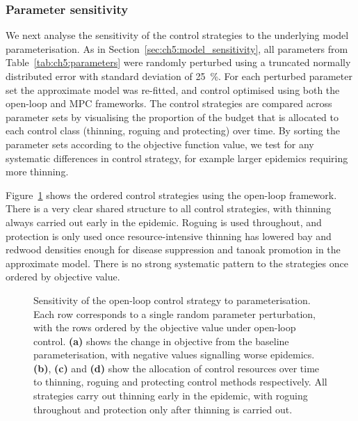 \subsubsection{Parameter sensitivity}

We next analyse the sensitivity of the control strategies to the underlying model parameterisation. As in Section~\ref{sec:ch5:model_sensitivity}, all parameters from Table~\ref{tab:ch5:parameters} were randomly perturbed using a truncated normally distributed error with standard deviation of \SI{25}{\percent}. For each perturbed parameter set the approximate model was re-fitted, and control optimised using both the open-loop and MPC frameworks. The control strategies are compared across parameter sets by visualising the proportion of the budget that is allocated to each control class (thinning, roguing and protecting) over time. By sorting the parameter sets according to the objective function value, we test for any systematic differences in control strategy, for example larger epidemics requiring more thinning.

Figure~\ref{fig:ch6:ol_sensitivity} shows the ordered control strategies using the open-loop framework. There is a very clear shared structure to all control strategies, with thinning always carried out early in the epidemic. Roguing is used throughout, and protection is only used once resource-intensive thinning has lowered bay and redwood densities enough for disease suppression and tanoak promotion in the approximate model. There is no strong systematic pattern to the strategies once ordered by objective value.

\begin{figure}[t]
    \begin{center}
        \caption[Open-loop control parameter sensitivity]{Sensitivity of the open-loop control strategy to parameterisation. Each row corresponds to a single random parameter perturbation, with the rows ordered by the objective value under open-loop control. \textbf{(a)} shows the change in objective from the baseline parameterisation, with negative values signalling worse epidemics. \textbf{(b)}, \textbf{(c)} and \textbf{(d)} show the allocation of control resources over time to thinning, roguing and protecting control methods respectively. All strategies carry out thinning early in the epidemic, with roguing throughout and protection only after thinning is carried out.\label{fig:ch6:ol_sensitivity}}
    \end{center}
\end{figure}

